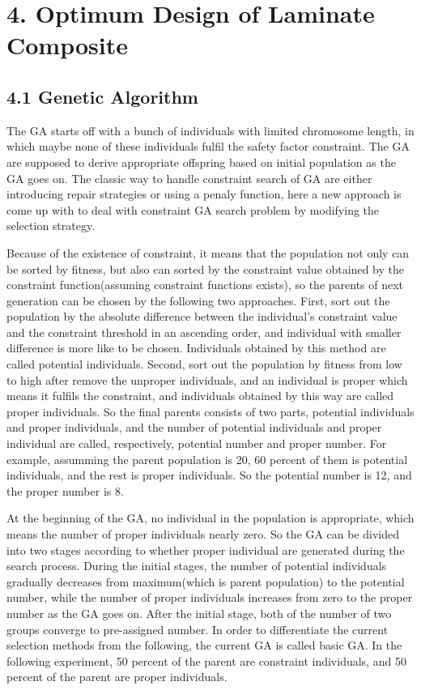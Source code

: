 \documentclass[Afour,sagev,times]{sagej}
\begin{document}
\section {4. Optimum Design of Laminate Composite}
\subsection{4.1  Genetic Algorithm}
The GA starts off with a bunch of individuals with limited chromosome length, in which maybe none
of these individuals fulfil the safety factor constraint. The GA are supposed to derive appropriate
offspring based on initial population as the GA goes on. The classic way to handle constraint
search of GA are either introducing repair strategies or using a penaly function, here a new
approach is come up with to deal with constraint GA search problem by modifying the selection
strategy. 

Because of the existence of constraint, it means that the population not only can be sorted by
fitness, but also can sorted by the constraint value obtained by the constraint function(assuming
constraint functions exists), so the
parents of next generation can be chosen by the following two approaches. First, sort out the population by
the absolute difference between the individual's constraint value and the constraint threshold in an
ascending order, and individual with smaller difference is more like to be chosen. Individuals
obtained by this method are called potential individuals. Second, sort out the population by
fitness from low to high after remove the unproper individuals, and an individual is proper which
means it fulfils the constraint, and individuals obtained by this way are called proper individuals.
So the final parents consists of two parts, potential individuals and proper individuals, and the
number of potential individuals and proper individual are called, respectively, potential number and
proper number. For example, assumming the parent population is 20, 60 percent of them is
potential individuals, and the rest is proper individuals. So the potential number is 12, and the
proper number is 8.

At the beginning of the GA, no individual in the population is appropriate, which means the
number of proper individuals nearly zero.  So the GA can be divided into two stages according to
whether proper individual are generated during the search process. During the initial stages, the
number of potential individuals gradually decreases from maximum(which is parent population) to the potential
number, while the number of proper individuals increases from zero to the proper number as the GA
goes on. After the initial stage, both of the number of two groups converge to pre-assigned number.
In order to differentiate the current selection methods from the following, the current GA is called
basic GA. In the following experiment, 50 percent of the parent are constraint individuals, and 50
percent of the parent are proper individuals.
\end{document}
